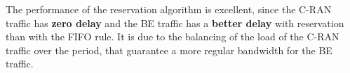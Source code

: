 \documentclass[10pt, conference, letterpaper]{IEEEtran}
\begin{document}
  The performance of the reservation algorithm is excellent, since the C-RAN traffic has {\bf zero delay} and the BE traffic has a \textbf{better delay} with reservation than with the FIFO rule. It is due to the balancing of the load of the C-RAN traffic over the period, that guarantee a more regular bandwidth for the BE traffic.



  

\end{document}
